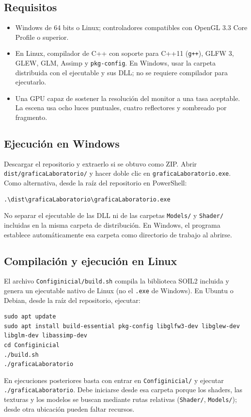 \documentclass[12pt,letterpaper]{article}
\begin{document}
\subsection{Requisitos}
\begin{itemize}
  \item Windows de 64 bits o Linux; controladores compatibles con OpenGL 3.3 Core Profile o superior.
  \item En Linux, compilador de C++ con soporte para C++11 (\texttt{g++}), GLFW 3, GLEW,
        GLM, Assimp y \texttt{pkg-config}. En Windows, usar la carpeta distribuida con el
        ejecutable y sus DLL; no se requiere compilador para ejecutarlo.
  \item Una GPU capaz de sostener la resolución del monitor a una tasa aceptable. La escena usa ocho luces
        puntuales, cuatro reflectores y sombreado por fragmento.
\end{itemize}

\subsection{Ejecución en Windows}
Descargar el repositorio y extraerlo si se obtuvo como ZIP. Abrir
\texttt{dist/graficaLaboratorio/} y hacer doble clic en
\texttt{graficaLaboratorio.exe}. Como alternativa, desde la raíz del repositorio en PowerShell:
\begin{lstlisting}
.\dist\graficaLaboratorio\graficaLaboratorio.exe
\end{lstlisting}
No separar el ejecutable de las DLL ni de las carpetas \texttt{Models/} y
\texttt{Shader/} incluidas en la misma carpeta de distribución. En Windows, el
programa establece automáticamente esa carpeta como directorio de trabajo al abrirse.

\subsection{Compilación y ejecución en Linux}
El archivo \texttt{Configinicial/build.sh} compila la biblioteca SOIL2 incluida y
genera un ejecutable nativo de Linux (no el \texttt{.exe} de Windows). En Ubuntu o
Debian, desde la raíz del repositorio, ejecutar:
\begin{lstlisting}
sudo apt update
sudo apt install build-essential pkg-config libglfw3-dev libglew-dev libglm-dev libassimp-dev
cd Configinicial
./build.sh
./graficaLaboratorio
\end{lstlisting}
En ejecuciones posteriores basta con entrar en \texttt{Configinicial/} y ejecutar
\texttt{./graficaLaboratorio}. Debe iniciarse desde esa carpeta porque los shaders,
las texturas y los modelos se buscan mediante rutas relativas (\texttt{Shader/},
\texttt{Models/}); desde otra ubicación pueden faltar recursos.
\end{document}
